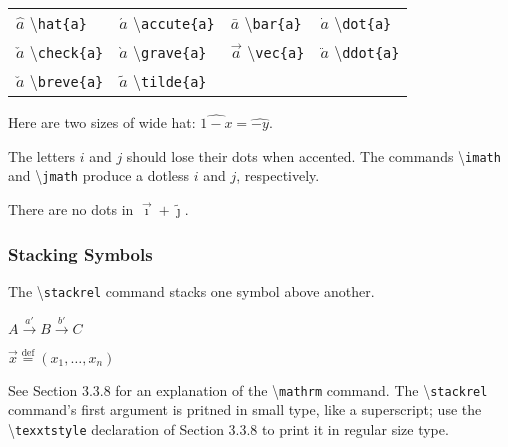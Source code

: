 \documentclass[twocolumn]{book}        %
\begin{document}
\begin{tabular}{l l l l}
        $\hat{a}$ \textbackslash \texttt{hat\{a\}}          &   
        $\acute{a}$ \textbackslash \texttt{accute\{a\}}     &
        $\bar{a}$ \textbackslash \texttt{bar\{a\}}          &
        $\dot{a}$ \textbackslash \texttt{dot\{a\}}          \\

        $\check{a}$ \textbackslash \texttt{check\{a\}}      &   
        $\grave{a}$ \textbackslash \texttt{grave\{a\}}      &
        $\vec{a}$ \textbackslash \texttt{vec\{a\}}          &
        $\ddot{a}$ \textbackslash \texttt{ddot\{a\}}        \\


        $\breve{a}$ \textbackslash \texttt{breve\{a\}}      &   
        $\tilde{a}$ \textbackslash \texttt{tilde\{a\}}        \\
\end{tabular}

Here are two sizes of wide hat: \( \widehat{1-x} = \widehat{-y} \).


The letters $i$ and $j$ should lose their dots when accented. The commands \textbackslash \texttt{imath}
and \textbackslash \texttt{jmath} produce a dotless $i$ and $j$, respectively.

There are no dots in \( \vec{\imath} + \tilde{\jmath} \).

\subsubsection{Stacking Symbols}

The \textbackslash \texttt{stackrel} command stacks one symbol above another.

\( A \stackrel{a'}{\rightarrow} B \stackrel{b'}{\rightarrow} C \)

\( \vec{x} \stackrel{\mathrm{def}}{=} (x_{1}, \ldots, x_{n}) \)

\noindent
See Section 3.3.8 for an explanation of the \textbackslash \texttt{mathrm} command. 
The \textbackslash \texttt{stackrel} command's first argument is pritned in small type, like a superscript;
use the \textbackslash \texttt{texxtstyle} declaration of Section 3.3.8 to print it in regular size type.
\end{document}
